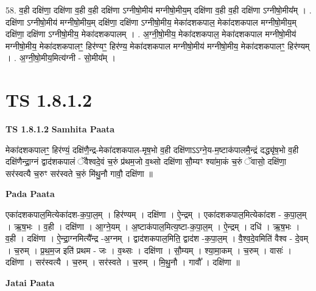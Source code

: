 \documentclass[17pt]{extarticle}
\begin{document}
58. व॒ही दक्षि॑णा॒ दक्षि॑णा व॒ही व॒ही दक्षि॑णा ऽग्नीषो॒मीय॑ मग्नीषो॒मीय॒म् दक्षि॑णा व॒ही व॒ही 
दक्षि॑णा ऽग्नीषो॒मीय᳚म् । . दक्षि॑णा ऽग्नीषो॒मीय॑ मग्नीषो॒मीय॒म् दक्षि॑णा॒ दक्षि॑णा ऽग्नीषो॒मीय॒ मेका॑दशकपाल॒ मेका॑दशकपाल मग्नीषो॒मीय॒म् दक्षि॑णा॒ दक्षि॑णा ऽग्नीषो॒मीय॒ मेका॑दशकपालम् । . अ॒ग्नी॒षो॒मीय॒ मेका॑दशकपाल॒ मेका॑दशकपाल मग्नीषो॒मीय॑ मग्नीषो॒मीय॒ मेका॑दशकपालꣳ॒॒ हिर॑ण्यꣳ॒॒ हिर॑ण्य॒ मेका॑दशकपाल मग्नीषो॒मीय॑ मग्नीषो॒मीय॒ मेका॑दशकपालꣳ॒॒ हिर॑ण्यम् । . अ॒ग्नी॒षो॒मीय॒मित्य॑ग्नी - सो॒मीय᳚म् । \newline
\pagebreak
{}

\section{ TS 1.8.1.2 }

\textbf{TS 1.8.1.2 } \newline
\textbf{Samhita Paata} \newline

मेका॑दशकपालꣳ॒॒ हिर॑ण्यं॒ दक्षि॑णै॒न्द्र-मेका॑दशकपाल-मृष॒भो व॒ही दक्षि॑णाऽऽग्ने॒य-म॒ष्टाक॑पालमै॒न्द्रं दद्ध्यृ॑ष॒भो व॒ही दक्षि॑णैन्द्रा॒ग्नं द्वाद॑शकपालं ॅवैश्वदे॒वं च॒रुं प्र॑थम॒जो व॒थ्सो दक्षि॑णा सौ॒म्यꣳ श्या॑मा॒कं च॒रुं ॅवासो॒ दक्षि॑णा॒ सर॑स्वत्यै च॒रुꣳ सर॑स्वते च॒रुं मि॑थु॒नौ गावौ॒ दक्षि॑णा ॥ \newline

\textbf{Pada Paata} \newline

एका॑दशकपाल॒मित्येका॑दश-क॒पा॒ल॒म् । हिर॑ण्यम् । दक्षि॑णा । ऐ॒न्द्रम् । एका॑दशकपाल॒मित्येका॑दश - क॒पा॒ल॒म् । ऋ॒ष॒भः । व॒ही । दक्षि॑णा । आ॒ग्ने॒यम् । अ॒ष्टाक॑पाल॒मित्य॒ष्टा-क॒पा॒ल॒म् । ऐ॒न्द्रम् । दधि॑ । ऋ॒ष॒भः । व॒ही । दक्षि॑णा । ऐ॒न्द्रा॒ग्नमित्यै᳚न्द्र -अ॒ग्नम् । द्वाद॑शकपाल॒मिति॒ द्वाद॑श -क॒पा॒ल॒म् । वै॒श्व॒दे॒वमिति॑ वैश्व - दे॒वम् । च॒रुम् । प्र॒थ॒म॒ज इति॑ प्रथम - जः । व॒थ्सः । दक्षि॑णा । सौ॒म्यम् । श्या॒मा॒कम् । च॒रुम् । वासः॑ । दक्षि॑णा । सर॑स्वत्यै । च॒रुम् । सर॑स्वते । च॒रुम् । मि॒थु॒नौ । गावौ᳚ । दक्षि॑णा ॥  \newline



\textbf{Jatai Paata} \newline
\end{document}
